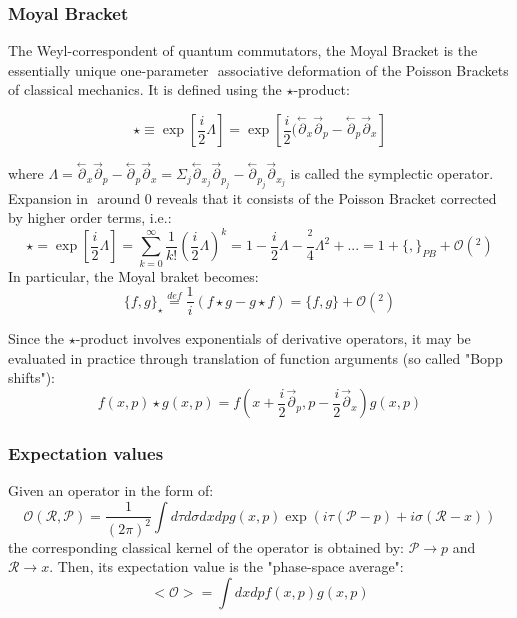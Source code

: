 \documentclass[twoside,a4paper,11pt]{article}
\numberwithin{equation}{section}
\newcommand{\parl}{\overset{\leftarrow}{\partial}}
\newcommand{\parr}{\overset{\rightarrow}{\partial}}
\begin{document}
\subsubsection{Moyal Bracket}

The Weyl-correspondent of quantum commutators, the Moyal Bracket is the essentially unique one-parameter $ $ associative deformation of the Poisson Brackets of classical mechanics. It is defined using the $\star$-product:

\begin{equation}
    \star \equiv \exp \left[\frac{i }{2}\Lambda \right] = \exp \left[\frac{i }{2}(\parl_x\parr_p - \parl_p\parr_x \right]
\end{equation}

where $\Lambda = \parl_x \parr_p - \parl_p\parr_x = \Sigma_j \parl_{x_j}\parr_{p_j} - \parl_{p_j}\parr_{x_j} $ is called the symplectic operator.\\

Expansion in $ $ around 0 reveals that it consists of the Poisson Bracket corrected by higher order terms, i.e.:
\begin{equation}
    \star = \exp \left[\frac{i }{2}\Lambda \right] = \sum_{k=0}^{\infty} \frac{1}{k!} \left(\frac{i }{2}\Lambda \right)^k = 1 - \frac{i }{2}\Lambda - \frac{ ^2}{4}\Lambda^2 + ... = 1+  \{,\}_{PB} + \mathcal{O}( ^2)
\end{equation}
In particular, the Moyal braket becomes:
\begin{equation}
    \{f, g\}_\star \stackrel{def}{=}\frac{1}{i  } \left( f \star g - g \star f \right) = \{f,g\}  + \mathcal{O}( ^2)
\end{equation}

Since the $\star$-product involves exponentials of derivative operators, it may be evaluated in practice through translation of function arguments (so called "Bopp shifts"):
\begin{equation}
    f(x,p)\star g(x,p) = f(x + \frac{i }{2}\parr_p,p - \frac{i }{2}\parr_x)g(x,p)
\end{equation}

\subsubsection{Expectation values}
Given an operator in the form of:
\begin{equation}
    \mathcal{O} (\mathcal{R}, \mathcal{P}) = \frac{1}{(2\pi)^2} \int d \tau d\sigma dx dp g(x,p) \exp (i\tau(\mathcal{P} - p) + i \sigma (\mathcal{R} - x))
\end{equation}
the corresponding classical kernel of the operator is obtained by: $\mathcal{P} \rightarrow p$ and $\mathcal{R}\rightarrow x$. Then, its expectation value is the "phase-space average":
\begin{equation}
    <\mathcal{O}> = \int dx dp f(x,p) g(x,p)
\end{equation}
\end{document}

